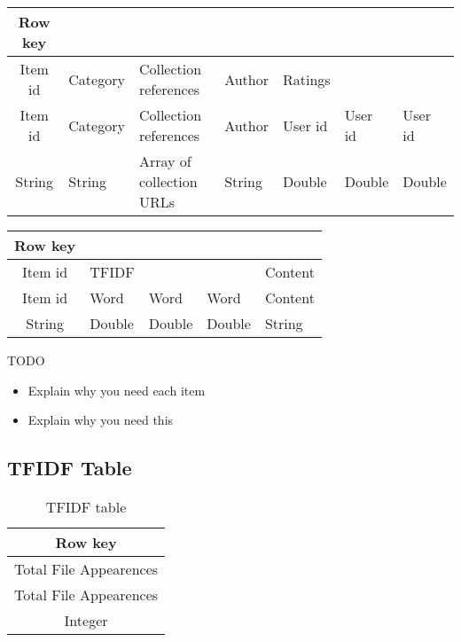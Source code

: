 \begin{table}[h]
\centering
\label{item-tabel-format-two}
\begin{tabular}{@{}cllllll@{}}
Row key &  &  &  &  &  &  \\ \toprule
Item id & \multicolumn{1}{l}{Category} & \multicolumn{1}{l}{Collection references} & \multicolumn{1}{l}{Author} & \multicolumn{1}{l}{Ratings} & \multicolumn{1}{l}{} & \multicolumn{1}{l}{} \\ 
Item id & \multicolumn{1}{l}{Category} & \multicolumn{1}{l}{Collection references} & \multicolumn{1}{l}{Author} & \multicolumn{1}{l}{User id} & \multicolumn{1}{l}{User id} & \multicolumn{1}{l}{User id} \\ 
String & \multicolumn{1}{l}{String} & \multicolumn{1}{l}{Array of collection URLs} & \multicolumn{1}{l}{String} & \multicolumn{1}{l}{Double} & \multicolumn{1}{l}{Double} & \multicolumn{1}{l}{Double} \\ 
\end{tabular}
\end{table}

\begin{table}[!h]
\centering
\label{item-tabel-format-three}
\begin{tabular}{@{}cllll@{}}
Row key &  &  &  &  \\ \toprule
Item id & \multicolumn{1}{l}{TFIDF} & \multicolumn{1}{l}{} & \multicolumn{1}{l}{} & \multicolumn{1}{l}{Content} \\ 
Item id & \multicolumn{1}{l}{Word} & \multicolumn{1}{l}{Word} & \multicolumn{1}{l}{Word} & \multicolumn{1}{l}{Content} \\ 
String & \multicolumn{1}{l}{Double} & \multicolumn{1}{l}{Double} & \multicolumn{1}{l}{Double} & \multicolumn{1}{l}{String} \\ 
\end{tabular}
\end{table}

TODO
\begin{itemize}
	\item Explain why you need each item
	\item Explain why you need this	
\end{itemize}

\subsection{TFIDF Table}
\label{sec:tfidf-table}

\begin{table}[!htbp]
\centering
\caption{TFIDF table }
\label{TFIDF-table}
\begin{tabular}{@{}c@{}}
Row key \\ \toprule
Total File Appearences \\ 
Total File Appearences \\ 
Integer \\ 
\end{tabular}
\end{table}

